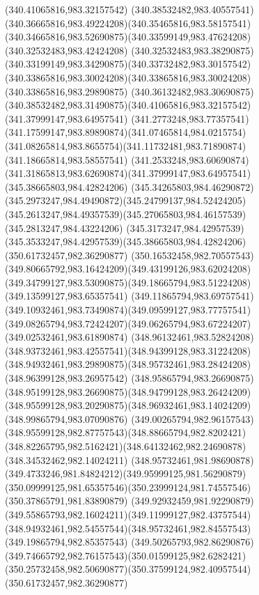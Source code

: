 {{		\moveto(340.41065816,983.32157542)
		\curveto(340.38532482,983.40557541)(340.36665816,983.49224208)(340.35465816,983.58157541)
		\curveto(340.34665816,983.52690875)(340.33599149,983.47624208)(340.32532483,983.42424208)
		\curveto(340.32532483,983.38290875)(340.33199149,983.34290875)(340.33732482,983.30157542)
		\curveto(340.33865816,983.30024208)(340.33865816,983.30024208)(340.33865816,983.29890875)
		\curveto(340.36132482,983.30690875)(340.38532482,983.31490875)(340.41065816,983.32157542)
		\moveto(341.37999147,983.64957541)
		\curveto(341.2773248,983.77357541)(341.17599147,983.89890874)(341.07465814,984.0215754)
		\curveto(341.08265814,983.8655754)(341.11732481,983.71890874)(341.18665814,983.58557541)
		\curveto(341.2533248,983.60690874)(341.31865813,983.62690874)(341.37999147,983.64957541)
		\moveto(345.38665803,984.42824206)
		\curveto(345.34265803,984.46290872)(345.2973247,984.49490872)(345.24799137,984.52424205)
		\curveto(345.2613247,984.49357539)(345.27065803,984.46157539)(345.2813247,984.43224206)
		\curveto(345.3173247,984.42957539)(345.3533247,984.42957539)(345.38665803,984.42824206)
		\moveto(350.61732457,982.36290877)
		\curveto(350.16532458,982.70557543)(349.80665792,983.16424209)(349.43199126,983.62024208)
		\curveto(349.34799127,983.53090875)(349.18665794,983.51224208)(349.13599127,983.65357541)
		\curveto(349.11865794,983.69757541)(349.10932461,983.73490874)(349.09599127,983.77757541)
		\curveto(349.08265794,983.72424207)(349.06265794,983.67224207)(349.02532461,983.61890874)
		\curveto(348.96132461,983.52824208)(348.93732461,983.42557541)(348.94399128,983.31224208)
		\curveto(348.94932461,983.29890875)(348.95732461,983.28424208)(348.96399128,983.26957542)
		\curveto(348.95865794,983.26690875)(348.95199128,983.26690875)(348.94799128,983.26424209)
		\curveto(348.95599128,983.20290875)(348.96932461,983.14024209)(348.99865794,983.07090876)
		\curveto(349.00265794,982.96157543)(348.95599128,982.87757543)(348.88665794,982.8202421)
		\curveto(348.82265795,982.5162421)(348.64132462,982.24690878)(348.34532462,982.14024211)
		\curveto(348.95732461,981.98690878)(349.4733246,981.84824212)(349.95999125,981.56290879)
		\curveto(350.09999125,981.65357546)(350.23999124,981.74557546)(350.37865791,981.83890879)
		\curveto(349.92932459,981.92290879)(349.55865793,982.16024211)(349.11999127,982.43757544)
		\curveto(348.94932461,982.54557544)(348.95732461,982.84557543)(349.19865794,982.85357543)
		\curveto(349.50265793,982.86290876)(349.74665792,982.76157543)(350.01599125,982.6282421)
		\curveto(350.25732458,982.50690877)(350.37599124,982.40957544)(350.61732457,982.36290877)
	}
}
